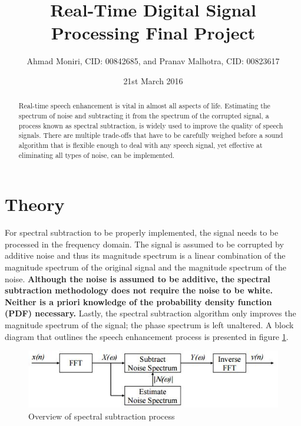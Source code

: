 \documentclass[a4paper,pra,twocolumn,10pt,aps,longbibliography,nobalancelastpage]{revtex4-1}
\begin{document}
\title{Real-Time Digital Signal Processing Final Project}
\author{Ahmad Moniri, CID: 00842685, and Pranav Malhotra, CID: 00823617}
\date{21st March 2016}

\begin{abstract}
Real-time speech enhancement is vital in almost all aspects of life. Estimating the spectrum of noise and subtracting it from the spectrum of the corrupted signal, a process known as spectral subtraction, is widely used to improve the quality of speech signals. There are multiple trade-offs that have to be carefully weighed before a sound algorithm that is flexible enough to deal with any speech signal, yet effective at eliminating all types of noise, can be implemented.
\end{abstract}

\maketitle
\section{Theory}\label{sec:theory} 
For spectral subtraction to be properly implemented, the signal needs to be processed in the frequency domain. The signal is assumed to be corrupted by additive noise and thus its magnitude spectrum is a linear combination of the magnitude spectrum of the original signal and the magnitude spectrum of the noise. \textbf{Although the noise is assumed to be additive, the spectral subtraction methodology does not require the noise to be white. Neither is a priori knowledge of the probability density function (PDF) necessary.} Lastly, the spectral subtraction algorithm only improves the magnitude spectrum of the signal; the phase spectrum is left unaltered. A block diagram that outlines the speech enhancement process is presented in figure \ref{fig:spec_sub_overview}.

\begin{figure}[H]
    \includegraphics[width=\columnwidth]{spec_sub_overview}
    \caption{Overview of spectral subtraction process}
    \label{fig:spec_sub_overview}
\end{figure}
\end{document}
